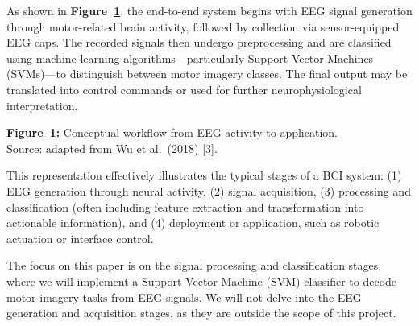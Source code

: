 \documentclass[
  letterpaper,
  DIV=11,
  numbers=noendperiod]{scrartcl}
\begin{document}
As shown in \textbf{Figure~\ref{fig-pipeline}}, the end-to-end system
begins with EEG signal generation through motor-related brain activity,
followed by collection via sensor-equipped EEG caps. The recorded
signals then undergo preprocessing and are classified using machine
learning algorithms---particularly Support Vector Machines (SVMs)---to
distinguish between motor imagery classes. The final output may be
translated into control commands or used for further neurophysiological
interpretation.

\begin{figure}


\caption{\label{fig-pipeline}}

\end{figure}%

\textbf{Figure~\ref{fig-pipeline}:} Conceptual workflow from EEG
activity to application.\\
Source: adapted from Wu et al.~(2018) {[}3{]}.

This representation effectively illustrates the typical stages of a BCI
system: (1) EEG generation through neural activity, (2) signal
acquisition, (3) processing and classification (often including feature
extraction and transformation into actionable information), and (4)
deployment or application, such as robotic actuation or interface
control.

The focus on this paper is on the signal processing and classification
stages, where we will implement a Support Vector Machine (SVM)
classifier to decode motor imagery tasks from EEG signals. We will not
delve into the EEG generation and acquisition stages, as they are
outside the scope of this project.
\end{document}
